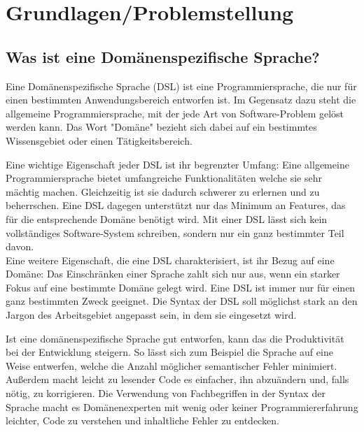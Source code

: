 
\chapter{Grundlagen/Problemstellung}\label{chp:grundlagen}

\section{Was ist eine Domänenspezifische Sprache?}\label{sct:dsldef}
Eine Domänenspezifische Sprache (DSL) ist eine Programmiersprache, die nur für einen bestimmten Anwendungsbereich entworfen ist. Im Gegensatz dazu steht die allgemeine Programmiersprache, mit der jede Art von Software-Problem gelöst werden kann\cite{www:fowlerDSL}. Das Wort "Domäne" bezieht sich dabei auf ein bestimmtes Wissensgebiet oder einen Tätigkeitsbereich.

Eine wichtige Eigenschaft jeder DSL ist ihr begrenzter Umfang: Eine allgemeine Programmiersprache bietet umfangreiche Funktionalitäten welche sie sehr mächtig machen. Gleichzeitig ist sie dadurch schwerer zu erlernen und zu beherrschen. Eine DSL dagegen unterstützt nur das Minimum an Features, das für die entsprechende Domäne benötigt wird. Mit einer DSL lässt sich kein vollständiges Software-System schreiben, sondern nur ein ganz bestimmter Teil davon.\\
Eine weitere Eigenschaft, die eine DSL charakterisiert, ist ihr Bezug auf eine Domäne: Das Einschränken einer Sprache zahlt sich nur aus, wenn ein starker Fokus auf eine bestimmte Domäne gelegt wird. Eine DSL ist immer nur für einen ganz bestimmten Zweck geeignet\cite{book:fowlerDSL}. Die Syntax der DSL soll möglichst stark an den Jargon des Arbeitsgebiet angepasst sein, in dem sie eingesetzt wird.

Ist eine domänenspezifische Sprache gut entworfen, kann das die Produktivität bei der Entwicklung steigern. So lässt sich zum Beispiel die Sprache auf eine Weise entwerfen, welche die Anzahl möglicher semantischer Fehler minimiert. Außerdem macht leicht zu lesender Code es einfacher, ihn abzuändern und, falls nötig, zu korrigieren. Die Verwendung von Fachbegriffen in der Syntax der Sprache macht es Domänenexperten mit wenig oder keiner Programmiererfahrung leichter, Code zu verstehen und inhaltliche Fehler zu entdecken.


